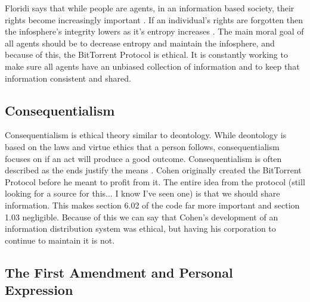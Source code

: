 \documentclass[11pt]{article}
\begin{document}
Floridi says that while people are agents, in an information based society, their rights become increasingly important \cite[4]{floridiInfo}. If an individual's rights are forgotten then the infosphere's integrity lowers as it's entropy increases \cite[10]{floridiInfo}. The main moral goal of all agents should be to decrease entropy and maintain the infosphere, and because of this, the BitTorrent Protocol is ethical. It is constantly working to make sure all agents have an unbiased collection of information and to keep that information consistent and shared.

\subsection{Consequentialism}


Consequentialism is ethical theory similar to deontology. While deontology is based on the laws and virtue ethics that a person follows, consequentialism focuses on if an act will produce a good outcome. Consequentialism is often described as the ends justify the means \cite{cons}. Cohen originally created the BitTorrent Protocol before he meant to profit from it. The entire idea from the protocol (still looking for a source for this... I know I've seen one) is that we should share information. This makes section 6.02 of the code far more important and section 1.03 negligible. Because of this we can say that Cohen's development of an information distribution system was ethical, but having his corporation to continue to maintain it is not.

\subsection{The First Amendment and Personal Expression}
\end{document}
